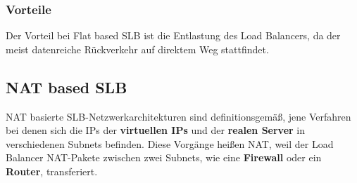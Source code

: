 \subsubsection{Vorteile}
Der Vorteil bei Flat based SLB ist die Entlastung des Load Balancers, da der meist datenreiche Rückverkehr auf direktem Weg stattfindet.

\newpage
\subsection{NAT based SLB}\cite{SLBbook}
\label{NATSLB}
NAT basierte SLB-Netzwerkarchitekturen sind definitionsgemäß, jene Verfahren bei denen sich die IPs der \textbf{virtuellen IPs} und der \textbf{realen Server} in verschiedenen Subnets befinden. Diese Vorgänge heißen NAT, weil der Load Balancer NAT-Pakete zwischen zwei Subnets, wie eine \textbf{Firewall} oder ein \textbf{Router}, transferiert.


